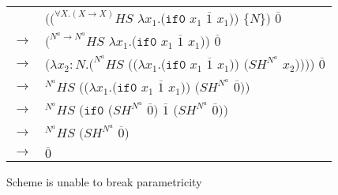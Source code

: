 \begin{figure}[tb]
\centering
\begin{tabular}{ll}
\vspace{5pt}

& $((^{\forall X.(X\rightarrow X)}HS$ $\lambda x_{1}.(\mathtt{if0}$ $x_{1}$ $\overline{1}$ $x_{1}))$ $\lbrace N\rbrace)$ $\overline{0}$ \\

\vspace{5pt}

$\rightarrow$ & $(^{N^{a}\rightarrow N^{a}}HS$ $\lambda x_{1}.(\mathtt{if0}$ $x_{1}$ $\overline{1}$ $x_{1}))$ $\overline{0}$ \\

\vspace{5pt}

$\rightarrow$ & $(\lambda x_{2}:N.(^{N^{a}}HS$ $((\lambda x_{1}.(\mathtt{if0}$ $x_{1}$ $\overline{1}$ $x_{1}))$ $(SH^{N^{a}}$ $x_{2}))))$ $\overline{0}$ \\

\vspace{5pt}

$\rightarrow$ & $^{N^{a}}HS$ $((\lambda x_{1}.(\mathtt{if0}$ $x_{1}$ $\overline{1}$ $x_{1}))$ $(SH^{N^{a}}$ $\overline{0}))$ \\

\vspace{5pt}

$\rightarrow$ & $^{N^{a}}HS$ $(\mathtt{if0}$ $(SH^{N^{a}}$ $\overline{0})$ $\overline{1}$ $(SH^{N^{a}}$ $\overline{0}))$ \\

\vspace{5pt}

$\rightarrow$ & ${^{N^{a}}H}S$ $(SH^{N^{a}}$ $\overline{0})$ \\

\vspace{5pt}

$\rightarrow$ & $\overline{0}$
\end{tabular}
\caption{Scheme is unable to break parametricity}
\label{forall-1}
\end{figure}